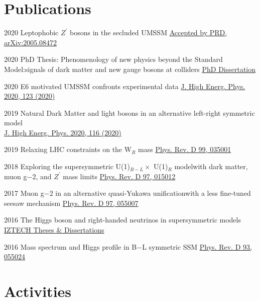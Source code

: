 \documentclass[]{friggeri-cv}
\begin{document}
\section{Publications}
\begin{entrylist}
	\entryp
	{2020}
	{Leptophobic $Z^\prime$ bosons in the secluded UMSSM}
	{\href{https://arxiv.org/abs/2005.08472}{Accepted by PRD, arXiv:2005.08472}} 
	
	\entryLongTitle
    {2020}
    {PhD Thesis: Phenomenology of new physics beyond the Standard Model:}{signals of dark matter and new gauge bosons at colliders}
    {\href{-}{PhD Dissertation}} 	
	
	\entryp
	{2020}
	{E6 motivated UMSSM confronts experimental data}
	{\href{https://doi.org/10.1007/JHEP05(2020)123}{J. High Energ. Phys. 2020, 123 (2020)}} 	
	
	\entryp
	{2019}
	{Natural Dark Matter and light bosons in an alternative left-right symmetric model \\}
	{\href{https://doi.org/10.1007/JHEP04(2020)116}{J. High Energ. Phys. 2020, 116 (2020)}} 
	
	\entryp
	{2019}
	{Relaxing LHC constraints on the W$_R$ mass}
	{\href{https://journals.aps.org/prd/abstract/10.1103/PhysRevD.99.035001}{Phys. Rev. D 99, 035001}} 
	
	\entryLongTitle
	{2018}
	{Exploring the supersymmetric U(1)$_{B-L} \times$ U(1)$_R$ model}{with dark matter, muon g−2, and $Z^\prime$ mass limits}
	{\href{https://journals.aps.org/prd/abstract/10.1103/PhysRevD.97.015012}{Phys. Rev. D 97, 015012}} 
	
	\entryLongTitle
	{2017}
	{Muon g−2 in an alternative quasi-Yukawa unification}{with a less fine-tuned seesaw mechanism}
	{\href{http://journals.aps.org/prd/abstract/10.1103/PhysRevD.97.055007}{Phys. Rev. D 97, 055007}} 
	
	\entryp
	{2016}
	{The Higgs boson and right-handed neutrinos in supersymmetric models \\}
	{\href{http://openaccess.iyte.edu.tr/xmlui/handle/11147/2842}{IZTECH Theses \& Dissertations}} 
	
	\entryp
	{2016}
	{Mass spectrum and Higgs profile in B−L symmetric SSM}
	{\href{http://journals.aps.org/prd/abstract/10.1103/PhysRevD.93.055024}{Phys. Rev. D 93, 055024}} 
	
\end{entrylist}

\section{Activities}
\end{document}
